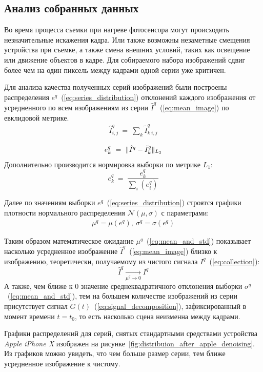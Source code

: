 \subsection{Анализ собранных данных}

Во время процесса съемки при нагреве фотосенсора могут происходить незначительные искажения кадра. Или также возможны незаметные смещения устройства при съемке, а также смена внешних условий, таких как освещение или движение объектов в кадре. Для собираемого набора изображений сдвиг более чем на один пиксель между кадрами одной серии уже критичен.

Для анализа качества полученных серий изображений были построены распределения $e^q$~(\ref{eq:series_distribution}) отклонений каждого изображения от усредненного по всем изображениям из серии $\hat{I}^q$~(\ref{eq:mean_image}) по евклидовой метрике.
\begin{eqnarray}\label{eq:mean_image}
\hat{I}^q_{i,j}\ =\ \sum_{k}\tilde{I}^q_{k\ i,j}
\end{eqnarray}

\begin{eqnarray}\label{eq:series_distribution}
e^q_k\ =\ \Arrowvert \hat{I}^q - \tilde{I}^q_k \Arrowvert_{L_2}
\end{eqnarray}
Дополнительно производится нормировка выборки по метрике $L_1$:
$$e^q_k\ =\ \frac{e^q_k}{\sum_{i}(e^q_i)}$$

Далее по значениям выборки $e^q$~(\ref{eq:series_distribution}) строятся графики плотности нормального распределения $\mathcal{N}(\mu, \sigma)$ с параметрами:
\begin{eqnarray}\label{eq:mean_and_std}
\mu^q = \mu(e^q),\ \sigma^q = \sigma(e^q)
\end{eqnarray}

Таким образом математическое ожидание $\mu^q$~(\ref{eq:mean_and_std}) показывает насколько усредненное изображение $\hat{I}^q$~(\ref{eq:mean_image}) близко к изображению, теоретически, получаемому из чистого сигнала $I^q$~(\ref{eq:collection}): 
$$\hat{I}^q \xrightarrow[\mu^q \rightarrow 0]{} I^q$$
А также, чем ближе к $0$ значение среднеквадратичного отклонения выборки $\sigma^q$~(\ref{eq:mean_and_std}), тем на большем количестве изображений из серии присутствует сигнал $G(t)$~(\ref{eq:signal_decomposition}), зафиксированный в момент времени $t = t_0$, то есть насколько сцена неизменна между кадрами.

Графики распределений для серий, снятых стандартными средствами устройства \textit{Apple iPhone X} изображен на рисунке~\ref{fig:distribuion_after_apple_denoising}. Из графиков можно увидеть, что чем больше размер серии, тем ближе усредненное изображение к чистому.

